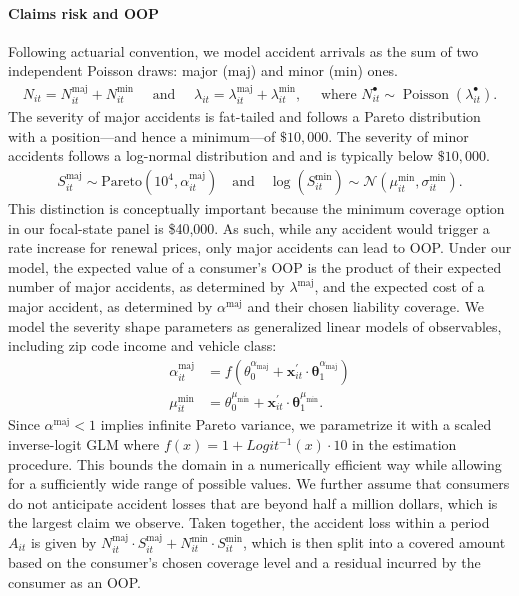 \paragraph{Claims risk and OOP}
Following actuarial convention, we model accident arrivals as the sum of two independent Poisson draws: major ($\mathrm{maj}$) and minor ($\mathrm{min}$) ones.
\begin{equation}\label{eq-claim-occurrence-model}
\begin{aligned}
N_{it}  = N_{it}^{\mathrm{maj}} + N_{it}^{\mathrm{min}}
\quad\text{ and }\quad
\lambda_{it} = \lambda_{it}^{\mathrm{maj}} + \lambda_{it}^{\mathrm{min}},
\quad
\text{ where } N^{\bullet}_{it} \sim \operatorname{Poisson}(\lambda^{\bullet}_{it}).
\end{aligned}
\end{equation}
The severity of major accidents is fat-tailed and follows a Pareto distribution with a position---and hence a minimum---of $\$10,000$. The severity of minor accidents follows a log-normal distribution and and is typically below $\$10,000$.
\begin{align}\label{eq-claim-severity-model}
    S_{it}^{\mathrm{maj}}  \sim \text{Pareto}(10^4, \alpha^{\mathrm{maj}}_{it}) \quad \text{and} \quad \log(S^{\mathrm{min}}_{it}) \sim \mathcal{N}(\mu^{\mathrm{min}}_{it}, \sigma^{\mathrm{min}}_{it}).
\end{align}
This distinction is conceptually important because the minimum coverage option in our focal-state panel is \$40,000. As such, while any accident would trigger a rate increase for renewal prices, only major accidents can lead to OOP. Under our model, the expected value of a consumer's OOP is the product of their expected number of major accidents, as determined by $\lambda^{\mathrm{maj}}$, and the expected cost of a major accident, as determined by $\alpha^{\mathrm{maj}}$ and their chosen liability coverage. We model the severity shape parameters as generalized linear models of observables, including zip code income and vehicle class:
\begin{align}\label{eq-claim-severity-hyper-params}
     \alpha_{it}^{\mathrm{maj}} & = f(\theta^{\alpha_\text{maj}}_0 + \mathbf{x}_{it}^\prime \cdot \mathbf{\theta}^{\alpha_\text{maj}}_{1}) \\
     \mu_{it}^{\mathrm{min}} & =  \theta^{\mu_\text{min}}_0 + \mathbf{x}_{it}^\prime \cdot \mathbf{\theta}^{\mu_\text{min}}_{1}.
\end{align}
Since $\alpha^{\mathrm{maj}}<1$ implies infinite Pareto variance, we parametrize it with a scaled inverse-logit GLM where $f(x) = 1 + Logit^{-1}(x) \cdot 10$ in the estimation procedure. This bounds the domain in a numerically efficient way while allowing for a sufficiently wide range of possible values. We further assume that consumers do not anticipate accident losses that are beyond half a million dollars, which is the largest claim we observe. Taken together, the accident loss within a period $A_{it}$ is given by $N_{it}^{\mathrm{maj}}\cdot S_{it}^{\mathrm{maj}} + N_{it}^{\mathrm{min}} \cdot S_{it}^{\mathrm{min}}$, which is then split into a covered amount based on the consumer's chosen coverage level and a residual incurred by the consumer as an OOP.

